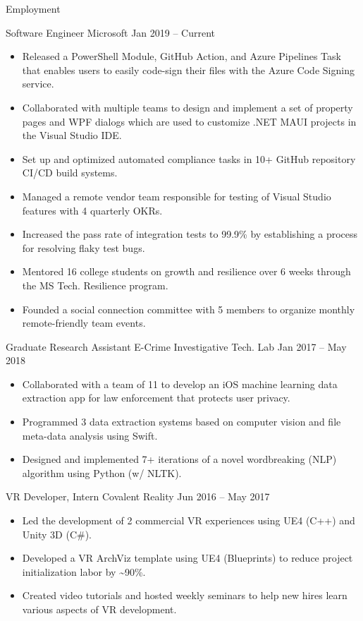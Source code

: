 \documentclass[]{mcdowellcv}
\begin{document}
	\makeheader
	
	\begin{cvsection}{Employment}
		\begin{cvsubsection} {Software Engineer} {Microsoft} {Jan 2019 -- Current}
			\begin{itemize}
				\item Released a PowerShell Module, GitHub Action, and Azure Pipelines Task that enables users to easily code-sign their files with the Azure Code Signing service.
				\item Collaborated with multiple teams to design and implement a set of property pages and WPF dialogs which are used to customize .NET MAUI projects in the Visual Studio IDE.
                \item Set up and optimized automated compliance tasks in 10+ GitHub repository CI/CD build systems.
				\item Managed a remote vendor team responsible for testing of Visual Studio features with 4 quarterly OKRs.
				\item Increased the pass rate of integration tests to 99.9\% by establishing a process for resolving flaky test bugs.	
				\item Mentored 16 college students on growth and resilience over 6 weeks through the MS Tech. Resilience program.
				\item Founded a social connection committee with 5 members to organize monthly remote-friendly team events.
			\end{itemize}
		\end{cvsubsection}

		\begin{cvsubsection} {Graduate Research Assistant} {E-Crime Investigative Tech. Lab} {Jan 2017 -- May 2018}
			\begin{itemize}
				\item Collaborated with a team of 11 to develop an iOS machine learning data extraction app for law enforcement that protects user privacy.
				\item Programmed 3 data extraction systems based on computer vision and file meta-data analysis using Swift.
				\item Designed and implemented 7+ iterations of a novel wordbreaking (NLP) algorithm using Python (w/ NLTK).
			\end{itemize}
		\end{cvsubsection}
		
		\begin{cvsubsection} {VR Developer, Intern} {Covalent Reality} {Jun 2016 -- May 2017}
			\begin{itemize}
				\item Led the development of 2 commercial VR experiences using UE4 (C++) and Unity 3D (C\#).
				\item Developed a VR ArchViz template using UE4 (Blueprints) to reduce project initialization labor by \~{}90\%.
				\item Created video tutorials and hosted weekly seminars to help new hires learn various aspects of VR development.
			\end{itemize}
		\end{cvsubsection}
		

\end{cvsection}
\end{document}
